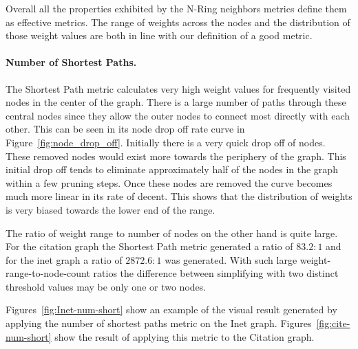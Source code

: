 Overall all the properties exhibited by the N-Ring neighbors metrics define them as effective  metrics.  The range of weights across the nodes and the distribution of those weight values are both in line with our definition of a good metric.

\paragraph*{Number of Shortest Paths.}
The Shortest Path metric calculates very high weight values for frequently visited nodes in the center of the graph.  There is a large number of paths through these central nodes since they allow the outer nodes to connect most directly with each other.  This can be seen in its node drop off rate curve in Figure~\ref{fig:node_drop_off}.  Initially there is a very quick drop off of nodes. These removed nodes would exist more towards the periphery of the graph.  This initial drop off tends to eliminate approximately half of the nodes in the graph within a few pruning steps.  Once these nodes are removed the curve becomes much more linear in its rate of decent.  This shows that the distribution of weights is very biased towards the lower end of the range.

The ratio of weight range to number of nodes on the other hand is quite large.  For the citation graph the Shortest Path metric generated a ratio of $83.2:1$ and for the inet graph a ratio of $2872.6:1$ was generated.  With such large weight-range-to-node-count ratios the difference between simplifying with two distinct threshold values may be only one or two nodes.

Figures~\ref{fig:Inet-num-short} show an example of the visual result generated by applying the number of shortest paths metric on the Inet graph.  Figures~\ref{fig:cite-num-short} show the result of applying this metric to the Citation graph.

